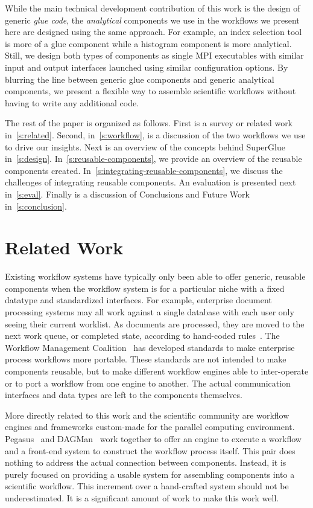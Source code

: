 \documentclass[conference]{IEEEtran}
\begin{document}
While the main technical development contribution of this work is the design of
generic {\em glue code}, the {\em analytical} components we use in the
workflows we present here are designed using the same approach. For example, an
index selection tool is more of a glue component while a histogram component is
more analytical.  Still, we design both types of components as single MPI
executables with similar input and output interfaces launched using similar
configuration options.  By blurring the line between generic glue components
and generic analytical components, we present a flexible way to assemble
scientific workflows without having to write any additional code. 

The rest of the paper is organized as follows. First is a survey or related
work in~\autoref{s:related}. Second, in~\autoref{s:workflow}, is a
discussion of the two workflows we use to drive our insights. Next is an
overview of the concepts behind SuperGlue in~\autoref{s:design}.  In~\autoref{s:reusable-components}, we provide an overview of the reusable
components created. In~\autoref{s:integrating-reusable-components}, we
discuss the challenges of integrating reusable components.  An evaluation is
presented next in~\autoref{s:eval}. Finally is a discussion of Conclusions
and Future Work in~\autoref{s:conclusion}.

\section{Related Work}
\label{s:related}

Existing workflow systems have typically only been able to offer generic,
reusable components when the workflow system is for a particular niche with a
fixed datatype and standardized interfaces. For example, enterprise document
processing systems may all work against a single database with each user only
seeing their current worklist. As documents are processed, they are moved to
the next work queue, or completed state, according to hand-coded
rules~\cite{mckesson-workflow}. The Workflow Management Coalition~\cite{wfmc}
has developed standards to make enterprise process workflows more portable.
These standards are not intended to make components reusable, but to make
different workflow engines able to inter-operate or to port a workflow from one
engine to another.  The actual communication interfaces and data types are left
to the components themselves.

More directly related to this work and the scientific community are workflow
engines and frameworks custom-made for the parallel computing environment.
Pegasus~\cite{mullender:pegasus} and DAGMan~\cite{Malewicz:2006:dagman} work
together to offer an engine to execute a workflow and a front-end system to
construct the workflow process itself. This pair does nothing to address the
actual connection between components. Instead, it is purely focused on
providing a usable system for assembling components into a scientific workflow.
This increment over a hand-crafted system should not be underestimated. It is a
significant amount of work to make this work well.
\end{document}

